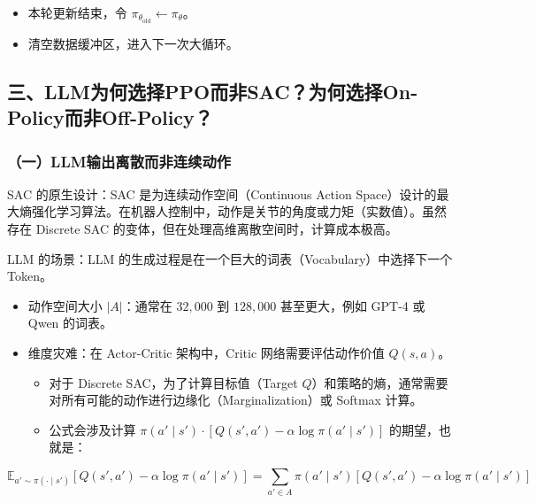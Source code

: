 \begin{itemize}
\tightlist
\item
  本轮更新结束，令 \(\pi_{\theta_{\mathrm{old}}} \leftarrow \pi_\theta\)。
\item
  清空数据缓冲区，进入下一次大循环。
\end{itemize}

\hypertarget{ux4e09llmux4e3aux4f55ux9009ux62e9ppoux800cux975esacux4e3aux4f55ux9009ux62e9on-policyux800cux975eoff-policy}{%
\subsection{三、LLM为何选择PPO而非SAC？为何选择On-Policy而非Off-Policy？}\label{ux4e09llmux4e3aux4f55ux9009ux62e9ppoux800cux975esacux4e3aux4f55ux9009ux62e9on-policyux800cux975eoff-policy}}

\hypertarget{ux4e00llmux8f93ux51faux79bbux6563ux800cux975eux8fdeux7eedux52a8ux4f5c}{%
\subsubsection{（一）LLM输出离散而非连续动作}\label{ux4e00llmux8f93ux51faux79bbux6563ux800cux975eux8fdeux7eedux52a8ux4f5c}}

SAC 的原生设计：SAC 是为连续动作空间（Continuous Action Space）设计的最大熵强化学习算法。在机器人控制中，动作是关节的角度或力矩（实数值）。虽然存在 Discrete SAC 的变体，但在处理高维离散空间时，计算成本极高。

LLM 的场景：LLM 的生成过程是在一个巨大的词表（Vocabulary）中选择下一个 Token。

\begin{itemize}
\tightlist
\item
  动作空间大小 \(|A|\)：通常在 \(32,000\) 到 \(128,000\) 甚至更大，例如 GPT-4 或 Qwen 的词表。
\item
  维度灾难：在 Actor-Critic 架构中，Critic 网络需要评估动作价值 \(Q(s,a)\)。

  \begin{itemize}
  \tightlist
  \item
    对于 Discrete SAC，为了计算目标值（Target \(Q\)）和策略的熵，通常需要对所有可能的动作进行边缘化（Marginalization）或 Softmax 计算。
  \item
    公式会涉及计算 \(\pi(a' \mid s') \cdot [Q(s',a') - \alpha \log \pi(a' \mid s')]\) 的期望，也就是：
  \end{itemize}
\end{itemize}

\[
\mathbb{E}_{a'\sim \pi(\cdot \mid s')}
\left[
Q(s',a')-\alpha\log\pi(a'\mid s')
\right]
=
\sum_{a'\in A}\pi(a'\mid s')
\left[
Q(s',a')-\alpha\log\pi(a'\mid s')
\right]
\]

